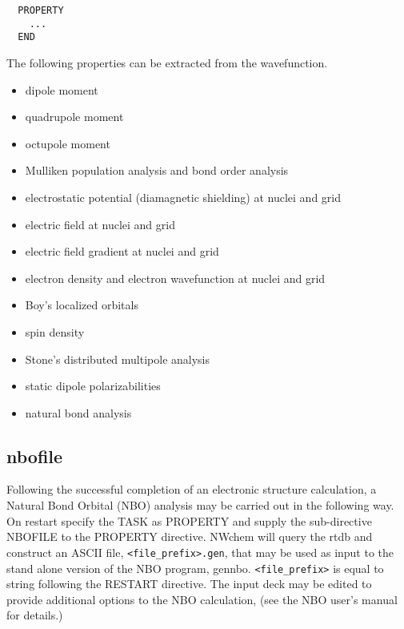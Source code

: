 \label{sec:property}
\begin{verbatim}
  PROPERTY
    ...
  END
\end{verbatim}

The following properties can be extracted from the wavefunction.

\begin{itemize}
\item dipole moment
\item quadrupole moment
\item octupole moment
\item Mulliken population analysis and bond order analysis
\item electrostatic potential (diamagnetic shielding) at nuclei and grid
\item electric field at nuclei and grid
\item electric field gradient at nuclei and grid
\item electron density and electron wavefunction at nuclei and grid
\item Boy's localized orbitals
\item spin density
\item Stone's distributed multipole analysis
\item static dipole polarizabilities
\item natural bond analysis
\end{itemize}

\subsection{nbofile}

Following the successful completion of an electronic structure
calculation, a Natural Bond Orbital (NBO) analysis may be carried out
in the following way.  On restart specify the TASK as PROPERTY and
supply the sub-directive NBOFILE to the PROPERTY directive.  NWchem
will query the rtdb and construct an ASCII file,
\verb+<file_prefix>.gen+, that may be used as input to the stand alone
version of the NBO program, gennbo.  \verb+<file_prefix>+ is equal to
string following the RESTART directive.  The input deck may be edited
to provide additional options to the NBO calculation, (see the NBO
user's manual for details.)

